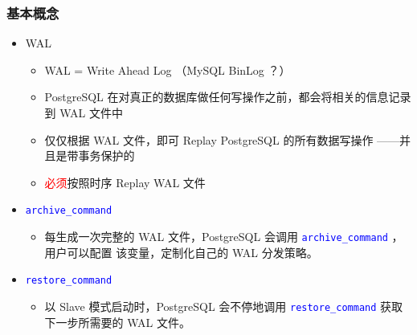 \documentclass[11pt, xetex, xcolor=x11names]{beamer}
\newcommand{\keyword}[1] {{\tt\small\textcolor{blue}{#1}}}
\begin{document}
\begin{frame}
  \frametitle{基本概念}
  \begin{itemize}
  \item WAL
  \begin{itemize}
  \item WAL = Write Ahead Log （MySQL BinLog ？）
  \item PostgreSQL 在对真正的数据库做任何写操作之前，都会将相关的信息记录到 WAL 文件中
  \item 仅仅根据 WAL 文件，即可 Replay PostgreSQL 的所有数据写操作 ——并且是带事务保护的
  \item \textcolor{red}{必须}按照时序 Replay WAL 文件
  \end{itemize}
  \end{itemize}

  \begin{itemize}
  \item \keyword{archive\_command}
  \begin{itemize}
  \item  每生成一次完整的 WAL 文件，PostgreSQL 会调用 \keyword{archive\_command} ，用户可以配置%
         该变量，定制化自己的 WAL 分发策略。
  \end{itemize}
  \end{itemize}

  \begin{itemize}
  \item \keyword{restore\_command}
  \begin{itemize}
  \item  以 Slave 模式启动时，PostgreSQL 会不停地调用 \keyword{restore\_command} 获取下一步所需要的
         WAL 文件。
  \end{itemize}
  \end{itemize}
\end{frame}
\end{document}
